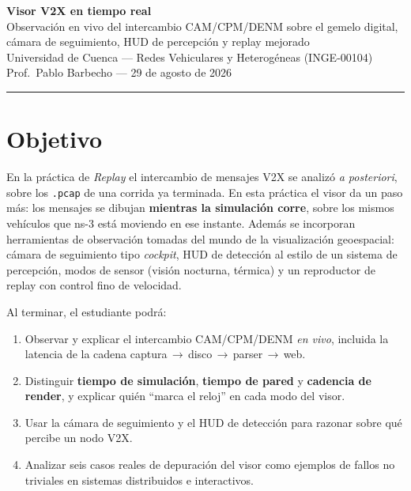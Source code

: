 \documentclass[11pt,a4paper]{article}
\begin{document}
\begin{center}
  {\color{azul}\LARGE\bfseries Visor V2X en tiempo real}\\[4pt]
  {\color{gris}\large Observación en vivo del intercambio CAM/CPM/DENM sobre el gemelo digital,\\
   cámara de seguimiento, HUD de percepción y replay mejorado}\\[6pt]
  {\small Universidad de Cuenca --- Redes Vehiculares y Heterogéneas (INGE-00104)\\
  Prof.\ Pablo Barbecho --- 29 de agosto de 2026}
\end{center}

\vspace{2pt}\hrule\vspace{8pt}

\tableofcontents

\section{Objetivo}

En la práctica de \emph{Replay} el intercambio de mensajes V2X se analizó
\emph{a posteriori}, sobre los \texttt{.pcap} de una corrida ya terminada. En
esta práctica el visor da un paso más: los mensajes se dibujan \textbf{mientras
la simulación corre}, sobre los mismos vehículos que ns-3 está moviendo en ese
instante. Además se incorporan herramientas de observación tomadas del mundo de
la visualización geoespacial: cámara de seguimiento tipo \emph{cockpit}, HUD de
detección al estilo de un sistema de percepción, modos de sensor (visión
nocturna, térmica) y un reproductor de replay con control fino de velocidad.

Al terminar, el estudiante podrá:

\begin{enumerate}[leftmargin=1.6em, itemsep=2pt]
  \item Observar y explicar el intercambio CAM/CPM/DENM \emph{en vivo}, incluida
        la latencia de la cadena captura\,$\to$\,disco\,$\to$\,parser\,$\to$\,web.
  \item Distinguir \textbf{tiempo de simulación}, \textbf{tiempo de pared} y
        \textbf{cadencia de render}, y explicar quién ``marca el reloj'' en cada
        modo del visor.
  \item Usar la cámara de seguimiento y el HUD de detección para razonar sobre
        qué percibe un nodo V2X.
  \item Analizar seis casos reales de depuración del visor como ejemplos de
        fallos no triviales en sistemas distribuidos e interactivos.
\end{enumerate}
\end{document}
